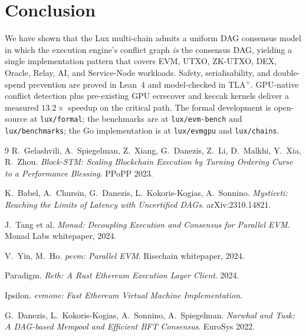 \section{Conclusion}


We have shown that the Lux multi-chain admits a uniform DAG consensus
model in which the execution engine's conflict graph \emph{is} the
consensus DAG, yielding a single implementation pattern that covers EVM,
UTXO, ZK-UTXO, DEX, Oracle, Relay, AI, and Service-Node workloads. Safety,
serialisability, and double-spend prevention are proved in Lean~4 and
model-checked in TLA$^+$. GPU-native conflict detection plus pre-existing
GPU ecrecover and keccak kernels deliver a measured $13.2\times$ speedup
on the critical path. The formal development is open-source at
\texttt{lux/formal}; the benchmarks are at \texttt{lux/evm-bench} and
\texttt{lux/benchmarks}; the Go implementation is at \texttt{lux/evmgpu}
and \texttt{lux/chains}.

\begin{thebibliography}{9}
R.~Gelashvili, A.~Spiegelman, Z.~Xiang, G.~Danezis, Z.~Li, D.~Malkhi,
Y.~Xia, R.~Zhou.
\emph{Block-STM: Scaling Blockchain Execution by Turning Ordering Curse to
a Performance Blessing}. PPoPP 2023.

K.~Babel, A.~Chursin, G.~Danezis, L.~Kokoris-Kogias, A.~Sonnino.
\emph{Mysticeti: Reaching the Limits of Latency with Uncertified DAGs}.
arXiv:2310.14821.

J.~Tang et al.
\emph{Monad: Decoupling Execution and Consensus for Parallel EVM}.
Monad Labs whitepaper, 2024.

V.~Yin, M.~Ho.
\emph{pevm: Parallel EVM}.
Risechain whitepaper, 2024.

Paradigm. \emph{Reth: A Rust Ethereum Execution Layer Client}. 2024.

Ipsilon. \emph{evmone: Fast Ethereum Virtual Machine Implementation}.

G.~Danezis, L.~Kokoris-Kogias, A.~Sonnino, A.~Spiegelman.
\emph{Narwhal and Tusk: A DAG-based Mempool and Efficient BFT Consensus}.
EuroSys 2022.
\end{thebibliography}

